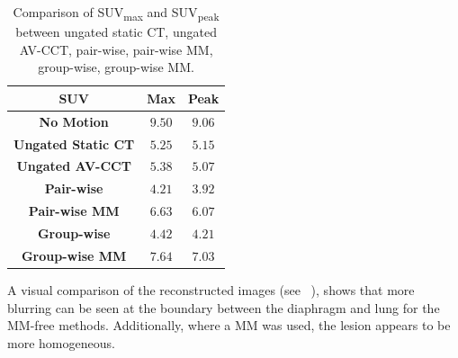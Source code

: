             \begin{table}
                \centering
                
                \captionsetup{singlelinecheck=false}
                \caption{
                    Comparison of \gls{SUV}\textsubscript{max} and \gls{SUV}\textsubscript{peak} between ungated static \gls{CT}, ungated \gls{AV-CCT}, pair-wise, pair-wise \gls{MM}, group-wise, group-wise \gls{MM}.
                }
                
                \resizebox*{1.0\linewidth}{!}
                {
                    \begin{tabular}{||c|cc||}
                        \hline
                        \textbf{\gls{SUV}}                  & \textbf{Max}  & \textbf{Peak} \\
                        \hline
                        \textbf{No Motion}                  & $9.50$        & $9.06$ \\
                        \hline
                        \textbf{Ungated Static \gls{CT}}    & $5.25$        & $5.15$ \\
                        \textbf{Ungated \gls{AV-CCT}}       & $5.38$        & $5.07$ \\
                        \hline
                        \textbf{Pair-wise}                  & $4.21$        & $3.92$ \\
                        \textbf{Pair-wise \gls{MM}}         & $6.63$        & $6.07$ \\
                        \hline
                        \textbf{Group-wise}                 & $4.42$        & $4.21$ \\
                        \textbf{Group-wise \gls{MM}}        & $7.64$        & $7.03$ \\
                        \hline
                    \end{tabular}
                }
                \label{tab:comparison_of_motion_correction_methods_incorporating_motion_modelling_for_pet_ct_using_a_single_breath_hold_attenuation_map_results_suv}
            \end{table}
            
            A visual comparison of the reconstructed images (see ~), shows that more blurring can be seen at the boundary between the diaphragm and lung for the \gls{MM}-free methods. Additionally, where a \gls{MM} was used, the lesion appears to be more homogeneous.
             
